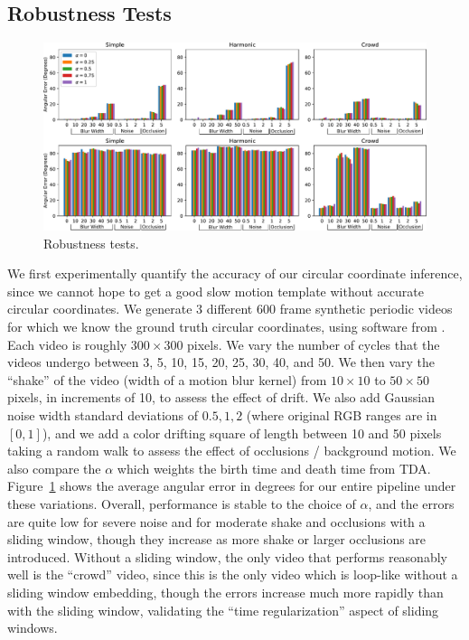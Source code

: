 \documentclass{article}
\begin{document}

\subsection{Robustness Tests}


\begin{figure}
\centering
\includegraphics[width=\columnwidth]{RobustnessTests.pdf}
\caption{Robustness tests.}
\label{fig:RobustnessTests}
\end{figure}



We first experimentally quantify the accuracy of our circular coordinate inference, since we cannot hope to get a good slow motion template without accurate circular coordinates.  We generate 3 different 600 frame synthetic periodic videos for which we know the ground truth circular coordinates, using software from \cite{jacobson2012fast}.  Each video is roughly $300 \times 300$ pixels.  We vary the number of cycles that the videos undergo between 3, 5, 10, 15, 20, 25, 30, 40, and 50.  We then vary the ``shake'' of the video (width of a motion blur kernel) from $10 \times 10 $ to $50 \times 50$ pixels, in increments of 10, to assess the effect of drift.  We also add Gaussian noise width standard deviations of $0.5, 1, 2$ (where original RGB ranges are in $[0, 1]$), and we add a color drifting square of length between 10 and 50 pixels taking a random walk to assess the effect of occlusions / background motion.  We also compare the $\alpha$ which weights the birth time and death time from TDA.  Figure~\ref{fig:RobustnessTests} shows the average angular error in degrees for our entire pipeline under these variations.  Overall, performance is stable to the choice of $\alpha$, and the errors are quite low for severe noise and for moderate shake and occlusions with a sliding window, though they increase as more shake or larger occlusions are introduced.  Without a sliding window, the only video that performs reasonably well is the ``crowd'' video, since this is the only video which is loop-like without a sliding window embedding, though the errors increase much more rapidly than with the sliding window, validating the ``time regularization'' aspect of sliding windows.  
\end{document}
